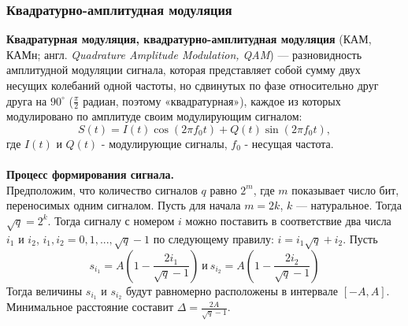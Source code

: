 \subsubsection{Квадратурно-амплитудная модуляция}
{\bf Квадратурная модуляция, квадратурно-амплитудная модуляция} (КАМ, КАМн; англ. {\it Quadrature Amplitude Modulation, QAM}) — разновидность амплитудной модуляции сигнала, которая представляет собой сумму двух несущих колебаний одной частоты, но сдвинутых по фазе относительно друг друга на $90^{\circ}$ ($\frac{\pi}{2}$ радиан, поэтому «квадратурная»), каждое из которых модулировано по амплитуде своим модулирующим сигналом:
$$S(t) = I(t)\cos(2\pi f_0t) + Q(t)\sin(2\pi f_0t),$$
где $I(t)$ и $Q(t)$ - модулирующие сигналы, $f_0$ - несущая частота.\\
\\
{\bf Процесс формирования сигнала.} \\\indent
Предположим, что количество сигналов $q$ равно $2^{m}$, где $m$ показывает число бит, переносимых одним сигналом. Пусть для начала  $m = 2k$, $k$ — натуральное. Тогда $\sqrt{q}=2^{k}$. Тогда сигналу с номером $i$ можно поставить в соответствие два числа  $i_1$ и $i_2$, $i_{1},i_{2} = 0,1,...,{\sqrt q}-1$ по следующему правилу: $i=i_{1}{\sqrt q}+i_{2}$. Пусть
$$
s_{i_1}=A\left(1-\frac{2i_1}{\sqrt{q}-1}\right)\: и\: s_{i_2}=A\left(1-\frac{2i_2}{\sqrt{q}-1}\right)
$$
Тогда величины $s_{{i_{1}}}$ и $s_{{i_{2}}}$ будут равномерно расположены в интервале $[-A,A]$. Минимальное расстояние составит $\Delta ={\frac {2A}{{\sqrt q}-1}}.$

